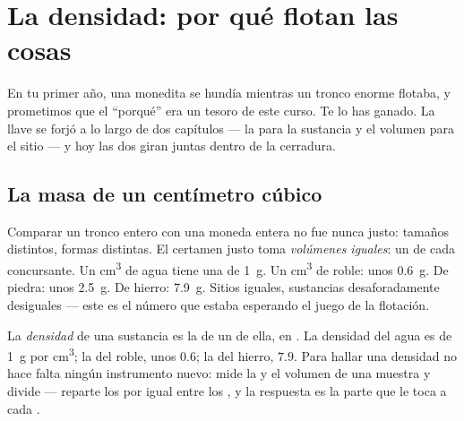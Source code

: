 \chapter{La densidad: por qué flotan las cosas}\label{ch:g6:density-floating}

En tu primer año, una monedita se hundía mientras un tronco enorme
flotaba, y prometimos que el ``porqué'' era un tesoro de este curso.
Te lo has ganado. La llave se forjó a lo largo de dos capítulos --- la
 para la sustancia y el volumen para el sitio --- y hoy las
dos giran juntas dentro de la cerradura.

\section{La masa de un centímetro cúbico}

\begin{example}\label{ex:g6:density-floating:fair}
Comparar un tronco entero con una moneda entera no fue nunca justo:
tamaños distintos, formas distintas. El certamen justo toma
\emph{volúmenes iguales}: un  de cada
concursante. Un \unit{cm^3} de agua tiene una  de \qty{1}{g}. Un
\unit{cm^3} de roble: unos \qty{0.6}{g}. De piedra: unos \qty{2.5}{g}.
De hierro: \qty{7.9}{g}. Sitios iguales, sustancias desaforadamente
desiguales --- este es el número que estaba esperando el juego de la
flotación.
\end{example}

\begin{definition}[La densidad]\label{def:g6:density-floating:density}
La \emph{densidad} de una sustancia es la  de un
 de ella, en . La densidad del agua es
de \qty{1}{g} por \unit{cm^3}; la del roble, unos $0.6$; la del
hierro, $7.9$. Para hallar una densidad no hace falta ningún
instrumento nuevo: mide la  y el volumen de una
muestra y divide --- reparte los  por igual entre los
, y la respuesta es la parte que le toca a cada
.
\end{definition}

